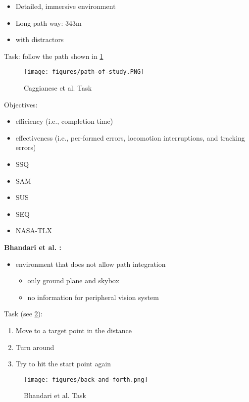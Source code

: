 \begin{itemize}
  \item Detailed, immersive environment
  \item Long path way: 343m
  \item with distractors
\end{itemize}


Task: follow the path shown in \ref{fig:path}


\begin{figure}[htb]
  \centering
  \texttt{[image: figures/path-of-study.PNG]}
  \caption{Caggianese et al. \cite{Caggianese} Task}
  \label{fig:path}
\end{figure}

Objectives:
\begin{itemize}
  \item efficiency (i.e., completion time)
  \item effectiveness (i.e., per-formed errors, locomotion interruptions, and tracking errors)
  \item SSQ
  \item SAM
  \item SUS
  \item SEQ
  \item NASA-TLX
\end{itemize}


\textbf{Bhandari et al. \cite{Bhandari}:}

\begin{itemize}
  \item environment that does not allow path integration
  \begin{itemize}
    \item only ground plane and skybox
    \item no information for peripheral vision system
  \end{itemize}
\end{itemize}

Task (see \ref{fig:backAndForth}):
\begin{enumerate}
  \item Move to a target point in the distance
  \item Turn around
  \item Try to hit the start point again
\end{enumerate}

\begin{figure}[htb]
  \centering
  \texttt{[image: figures/back-and-forth.png]}
  \caption{Bhandari et al. \cite{Bhandari} Task}
  \label{fig:backAndForth}
\end{figure}

